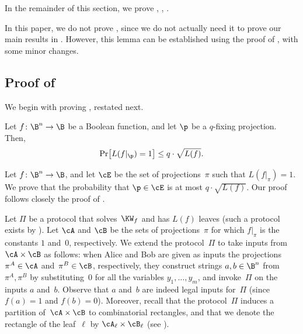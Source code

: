\documentclass{toc}
\begin{document}
\noindent In the remainder of this section, we prove
,
,
.
\begin{remark}
In this paper, we do not prove , since we
%
do not actually need it to prove our main results in .
%
However, this lemma can be
established using the proof of ,
with some minor changes. 
\end{remark}


\subsection{\label{subsec:shrinkage-to-single-literal}Proof of }

We begin with proving , restated
next.
\begin{restated}{}
Let $f\colon\B^{n}\to\B$ be a Boolean function, and let $\p$ be
a $q$-fixing projection. Then, 
\[
\Pr\!\left[L(f|_{\p})=1\right]\le q\cdot\sqrt{L(f)}.
\]
\end{restated}

Let $f\colon\B^{n}\to\B$, and let $\cE$ be the set of projections~$\pi$
such that $L(f|_{\pi})=1$. We prove that the probability that $\p\in\cE$
is at most $q\cdot\sqrt{L(f)}$. Our proof follows closely the proof
of \cite[Lemma 4.1]{H98}.

Let $\Pi$ be a protocol that solves~$\KW_{f}$ and has $L(f)$ leaves
(such a protocol exists by ).
Let $\cA$ and $\cB$
be the sets of projections~$\pi$ for which $f|_{\pi}$ is the constants
$1$ and~$0$, respectively. We extend the protocol~$\Pi$ to take
inputs from~$\cA\times\cB$ as follows: when Alice and Bob are given
as inputs the projections $\pi^{A}\in\cA$ and~$\pi^{B}\in\cB$,
respectively, they construct strings $a,b\in\B^{n}$ from $\pi^{A},\pi^{B}$
by substituting~$0$ for all the variables $y_{1},\ldots,y_{m}$,
and invoke~$\Pi$ on the inputs $a$ and~$b$. Observe that $a$
and~$b$ are indeed legal inputs for~$\Pi$ (since $f(a)=1$ and
$f(b)=0$). Moreover, recall that the protocol~$\Pi$ induces a partition
of~$\cA\times\cB$ to combinatorial rectangles, and that we denote
the rectangle of the leaf~$\ell$ by $\cA_{\ell}\times\cB_{\ell}$
(see ).
\end{document}
